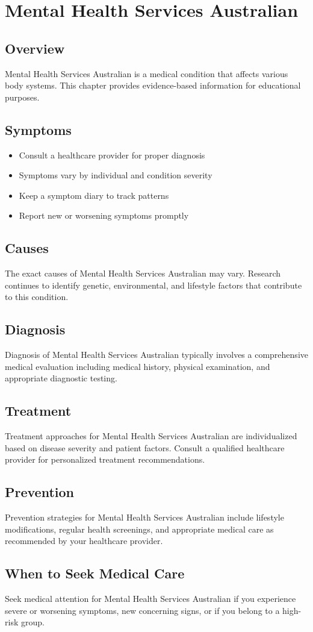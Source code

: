 \chapter{Mental Health Services Australian}

\section*{Overview}
Mental Health Services Australian is a medical condition that affects various body systems. This chapter provides evidence-based information for educational purposes.

\section*{Symptoms}
\begin{itemize}
  \item Consult a healthcare provider for proper diagnosis
  \item Symptoms vary by individual and condition severity
  \item Keep a symptom diary to track patterns
  \item Report new or worsening symptoms promptly
\end{itemize}

\section*{Causes}
The exact causes of Mental Health Services Australian may vary. Research continues to identify genetic, environmental, and lifestyle factors that contribute to this condition.

\section*{Diagnosis}
Diagnosis of Mental Health Services Australian typically involves a comprehensive medical evaluation including medical history, physical examination, and appropriate diagnostic testing.

\section*{Treatment}
Treatment approaches for Mental Health Services Australian are individualized based on disease severity and patient factors. Consult a qualified healthcare provider for personalized treatment recommendations.

\section*{Prevention}
Prevention strategies for Mental Health Services Australian include lifestyle modifications, regular health screenings, and appropriate medical care as recommended by your healthcare provider.

\section*{When to Seek Medical Care}
Seek medical attention for Mental Health Services Australian if you experience severe or worsening symptoms, new concerning signs, or if you belong to a high-risk group.
\clearpage
